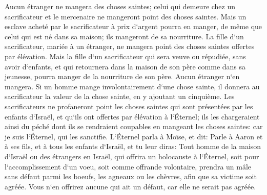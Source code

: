 \verse Aucun étranger ne mangera des choses saintes; celui qui demeure chez un sacrificateur et le mercenaire ne mangeront point des choses saintes. 
\verse Mais un esclave acheté par le sacrificateur à prix d`argent pourra en manger, de même que celui qui est né dans sa maison; ils mangeront de sa nourriture. 
\verse La fille d`un sacrificateur, mariée à un étranger, ne mangera point des choses saintes offertes par élévation. 
\verse Mais la fille d`un sacrificateur qui sera veuve ou répudiée, sans avoir d`enfants, et qui retournera dans la maison de son père comme dans sa jeunesse, pourra manger de la nourriture de son père. Aucun étranger n`en mangera. 
\verse Si un homme mange involontairement d`une chose sainte, il donnera au sacrificateur la valeur de la chose sainte, en y ajoutant un cinquième. 
\verse Les sacrificateurs ne profaneront point les choses saintes qui sont présentées par les enfants d`Israël, et qu`ils ont offertes par élévation à l`Éternel; 
\verse ils les chargeraient ainsi du péché dont ils se rendraient coupables en mangeant les choses saintes: car je suis l`Éternel, qui les sanctifie. 
\verse L`Éternel parla à Moïse, et dit: 
\verse Parle à Aaron et à ses fils, et à tous les enfants d`Israël, et tu leur diras: Tout homme de la maison d`Israël ou des étrangers en Israël, qui offrira un holocauste à l`Éternel, soit pour l`accomplissement d`un voeu, soit comme offrande volontaire, 
\verse prendra un mâle sans défaut parmi les boeufs, les agneaux ou les chèvres, afin que sa victime soit agréée. 
\verse Vous n`en offrirez aucune qui ait un défaut, car elle ne serait pas agréée. 
